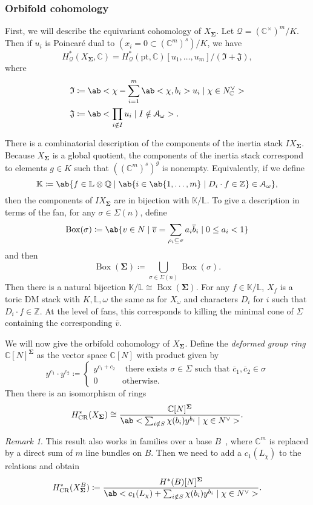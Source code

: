 \documentclass[leqno, openany]{memoir}
\theoremstyle{definition}
\theoremstyle{remark}
\newtheorem{rmk}[thm]{Remark}
\theoremstyle{plain}
\theoremstyle{definition}
\theoremstyle{remark}
\newcommand{\C}{\mathbb{C}}
\newcommand{\Z}{\mathbb{Z}}
\newcommand{\Q}{\mathbb{Q}}
\renewcommand{\L}{\mathbb{L}}
\newcommand{\mc}[1]{\mathcal{#1}}
\newcommand{\mf}[1]{\mathfrak{#1}}
\newcommand{\mr}[1]{\mathrm{#1}}
\newcommand{\on}[1]{\operatorname{#1}}
\newcommand{\ol}[1]{\overline{#1}}
\begin{document}
\subsubsection{Orbifold cohomology}%
\label{ssub:Orbifold cohomology}

First, we will describe the equivariant cohomology of $X_{\bm{\Sigma}}$. Let $\mc{Q} = (\C^{\times})^m/K$. Then if $u_i$ is Poincar\'e dual to $(x_i = 0 \subset (\C^m)^s)/K$, we have
\[ H_{\mc{Q}}^*(X_{\bm{\Sigma}}, \C) = H_{\mc{Q}}^*(\mr{pt}, \C) [u_1, \ldots, u_m] / (\mf{I} + \mf{J}), \]
where
\begin{align*}
    \mf{I} &\coloneqq \ab< \chi - \sum_{i=1}^m \ab<\chi, b_i>u_i \mid \chi \in N^{\vee}_{\C}> \\
    \mf{J} &\coloneqq \ab<\prod_{i \notin I} u_i \mid I \notin \mc{A}_{\omega}>.
\end{align*}

There is a combinatorial description of the components of the inertia stack $IX_{\bm{\Sigma}}$. Because $X_{\bm{\Sigma}}$ is a global quotient, the components of the inertia stack correspond to elements $g \in K$ such that $( (\C^m)^s )^g$ is nonempty. Equivalently, if we define
\[ \mathbb{K} \coloneqq \ab\{f \in \L \otimes \Q \mid \ab\{ i \in \ab\{1,\ldots,m\} \mid D_i \cdot f \in \Z\} \in \mc{A}_{\omega}\}, \]
then the components of $IX_{\bm{\Sigma}}$ are in bijection with $\mathbb{K}/\L$. To give a description in terms of the fan, for any $\sigma \in \Sigma(n)$, define
\[ \on{Box}(\sigma) \coloneqq \ab\{v \in N \mid \ol{v} = \sum_{\rho_i \subseteq \sigma} a_i \ol{b}_i \mid 0 \leq a_i < 1\}\]
and then
\[ \on{Box}(\bm{\Sigma}) \coloneqq \bigcup_{\sigma \in \Sigma(n)} \on{Box}(\sigma). \]
Then there is a natural bijection $\mathbb{K}/\L \cong \on{Box}(\bm{\Sigma})$. For any $f \in \mathbb{K}/\L$, $X_f$ is a toric DM stack with $K, \L, \omega$ the same as for $X_{\omega}$ and characters $D_i$ for $i$ such that $D_i \cdot f \in \Z$. At the level of fans, this corresponds to killing the minimal cone of $\Sigma$ containing the corresponding $\ol{v}$.

We will now give the orbifold cohomology of $X_{\bm{\Sigma}}$. Define the \textit{deformed group ring} $\C[N]^{\bm{\Sigma}}$ as the vector space $\C[N]$ with product given by
\[ y^{c_1} \cdot y^{c_2} \coloneqq \begin{cases}
    y^{c_1 + c_2} & \text{ there exists } \sigma \in \Sigma \text{ such that } \ol{c}_1, \ol{c}_2 \in \sigma \\
    0 & \text{otherwise}.
\end{cases}
\]
Then there is an isomorphism of rings~\cite{chowtoricdm}
\[ H^*_{\mr{CR}}(X_{\bm{\Sigma}}) \cong \frac{\C[N]^{\bm{\Sigma}}}{\ab<\sum_{i \notin S} \chi(b_i) y^{b_i} \mid \chi \in N^{\vee}>}. \]
\begin{rmk}
    This result also works in families over a base $B$~\cite{orbcohtoricstackbundle}, where $\C^m$ is replaced by a direct sum of $m$ line bundles on $B$. Then we need to add a $c_1(L_{\chi})$ to the relations and obtain
    \[ H^*_{\mr{CR}}(X^B_{\bm{\Sigma}}) \coloneqq \frac{H^*(B)[N]^{\bm{\Sigma}}}{\ab<c_1(L_{\chi}) + \sum_{i \notin S} \chi(b_i) y^{b_i} \mid \chi \in N^{\vee}>}. \]
\end{rmk}
\end{document}

